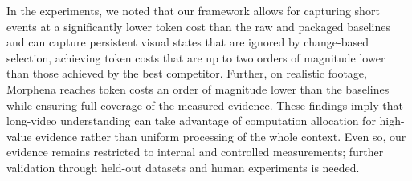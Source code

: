 \documentclass[conference]{IEEEtran}
\begin{document}
In the experiments, we noted that our framework allows for capturing short events at a significantly lower token cost than the raw and packaged baselines and can capture persistent visual states that are ignored by change-based selection, achieving token costs that are up to two orders of magnitude lower than those achieved by the best competitor. Further, on realistic footage, Morphena reaches token costs an order of magnitude lower than the baselines while ensuring full coverage of the measured evidence. These findings imply that long-video understanding can take advantage of computation allocation for high-value evidence rather than uniform processing of the whole context. Even so, our evidence remains restricted to internal and controlled measurements; further validation through held-out datasets and human experiments is needed.




\end{document}
